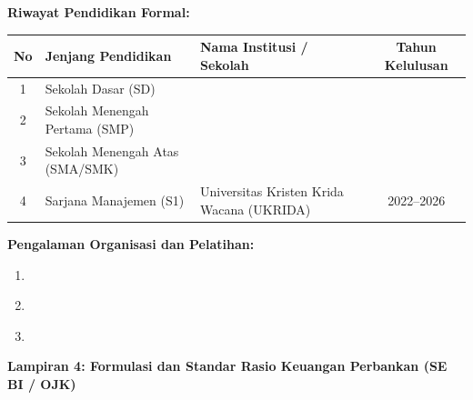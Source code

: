 \documentclass[12pt,a4paper]{article}
\numberwithin{equation}{section}
\begin{document}
\vspace{0.5cm}
\noindent \textbf{Riwayat Pendidikan Formal:}

\vspace{0.2cm}
\noindent
\begin{tabular}{|c|l|l|c|}
  \hline
  \textbf{No} & \textbf{Jenjang Pendidikan} & \textbf{Nama Institusi / Sekolah} & \textbf{Tahun Kelulusan} \\
  \hline
  1 & Sekolah Dasar (SD) & \underline{\hspace{6cm}} & \underline{\hspace{2cm}} \\
  \hline
  2 & Sekolah Menengah Pertama (SMP) & \underline{\hspace{6cm}} & \underline{\hspace{2cm}} \\
  \hline
  3 & Sekolah Menengah Atas (SMA/SMK) & \underline{\hspace{6cm}} & \underline{\hspace{2cm}} \\
  \hline
  4 & Sarjana Manajemen (S1) & Universitas Kristen Krida Wacana (UKRIDA) & 2022--2026 \\
  \hline
\end{tabular}

\vspace{0.5cm}
\noindent \textbf{Pengalaman Organisasi dan Pelatihan:}

\vspace{0.2cm}
\noindent
\begin{enumerate}
  \item \underline{\hspace{12cm}}
  \item \underline{\hspace{12cm}}
  \item \underline{\hspace{12cm}}
\end{enumerate}

\vspace{0.8cm}
\noindent \textbf{Lampiran 4: Formulasi dan Standar Rasio Keuangan Perbankan (SE BI / OJK)}
\end{document}
